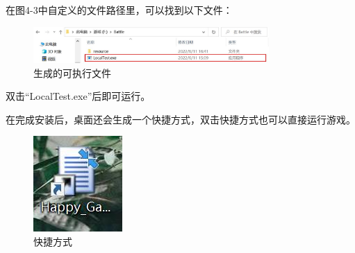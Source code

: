 \par
在图4-3中自定义的文件路径里，可以找到以下文件：
\par
\begin{figure}[htbp]
    \vspace{13pt} %
    \centering
    \includegraphics[width=0.8\textwidth]{images/4-6.jpg}
    \caption{生成的可执行文件}%
\end{figure}
\par
双击“LocalTest.exe”后即可运行。
\par
在完成安装后，桌面还会生成一个快捷方式，双击快捷方式也可以直接运行游戏。
\par
\begin{figure}[htbp]
    \vspace{13pt} %
    \centering
    \includegraphics[]{images/4-7.jpg}
    \caption{快捷方式}%
\end{figure}
